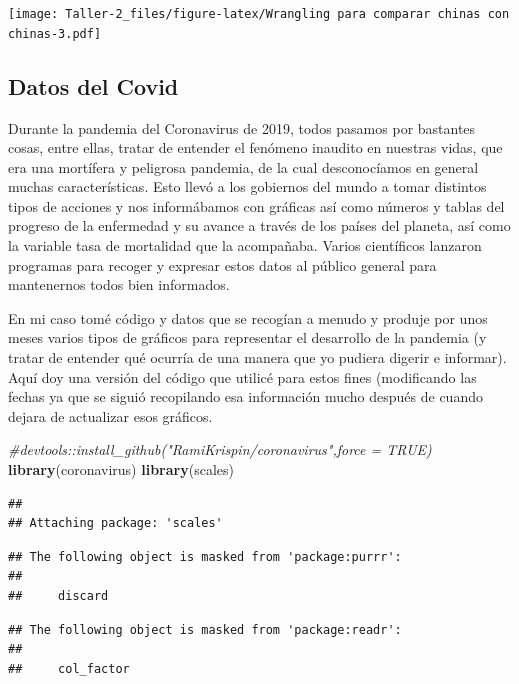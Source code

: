 \documentclass[
]{article}
\newenvironment{Shaded}{\begin{snugshade}}{\end{snugshade}}
\newcommand{\CommentTok}[1]{\textcolor[rgb]{0.56,0.35,0.01}{\textit{#1}}}
\newcommand{\FunctionTok}[1]{\textcolor[rgb]{0.13,0.29,0.53}{\textbf{#1}}}
\newcommand{\NormalTok}[1]{#1}
\begin{document}
\texttt{[image: Taller-2\_files/figure-latex/Wrangling para comparar chinas con chinas-3.pdf]}

\subsection{Datos del Covid}\label{datos-del-covid}

Durante la pandemia del Coronavirus de 2019, todos pasamos por bastantes
cosas, entre ellas, tratar de entender el fenómeno inaudito en nuestras
vidas, que era una mortífera y peligrosa pandemia, de la cual
desconocíamos en general muchas características. Esto llevó a los
gobiernos del mundo a tomar distintos tipos de acciones y nos
informábamos con gráficas así como números y tablas del progreso de la
enfermedad y su avance a través de los países del planeta, así como la
variable tasa de mortalidad que la acompañaba. Varios científicos
lanzaron programas para recoger y expresar estos datos al público
general para mantenernos todos bien informados.

En mi caso tomé código y datos que se recogían a menudo y produje por
unos meses varios tipos de gráficos para representar el desarrollo de la
pandemia (y tratar de entender qué ocurría de una manera que yo pudiera
digerir e informar). Aquí doy una versión del código que utilicé para
estos fines (modificando las fechas ya que se siguió recopilando esa
información mucho después de cuando dejara de actualizar esos gráficos.

\begin{Shaded}
\begin{Highlighting}[]
\CommentTok{\#devtools::install\_github("RamiKrispin/coronavirus",force = TRUE)}
\FunctionTok{library}\NormalTok{(coronavirus)}
\FunctionTok{library}\NormalTok{(scales)}
\end{Highlighting}
\end{Shaded}

\begin{verbatim}
## 
## Attaching package: 'scales'
\end{verbatim}

\begin{verbatim}
## The following object is masked from 'package:purrr':
## 
##     discard
\end{verbatim}

\begin{verbatim}
## The following object is masked from 'package:readr':
## 
##     col_factor
\end{verbatim}
\end{document}
